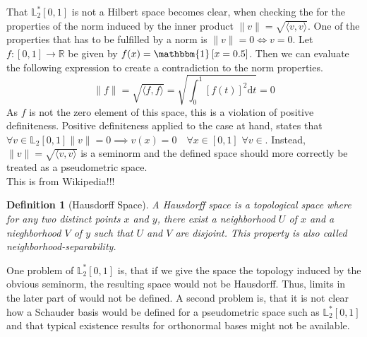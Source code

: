 \documentclass[12pt, a4paper]{article}
\theoremstyle{MAstyle} \newtheorem{assumption}{Assumption}[section]
\theoremstyle{MAstyle} \newtheorem{definition}{Definition}[section]
\theoremstyle{MAstyle} \newtheorem{theorem}{Theorem}[section]
\begin{document}
		That $\mathbb{L}^{*}_2[0,1]$ is not a Hilbert space becomes clear, when checking the for the properties of the norm induced by the inner product $\| v \| = \sqrt{\langle v, v\rangle}$.
		One of the properties that has to be fulfilled by a norm is $\| v \| = 0 \Longleftrightarrow v = 0$.			
		Let $f:[0,1] \rightarrow \mathbb{R}$ be given by $f(x) = \mathbbm{1}\left[x = 0.5\right]$. Then we can evaluate the following expression to create a contradiction to the norm properties.
		\begin{equation}
			\| f \| = \sqrt{\langle f, f\rangle} = \sqrt{\int_{0}^{1} \left[f(t)\right]^2\mathrm{d}t } = 0
		\end{equation}
		As $f$ is not the zero element of this space, this is a violation of positive definiteness. Positive definiteness applied to the case at hand, states that $\forall v \in \mathbb{L}_2[0,1] \| v \| = 0 \implies v(x) = 0 \quad \forall x \in [0,1]$  $\forall v \in $. Instead, $\| v \| = \sqrt{\langle v, v\rangle}$ is a seminorm and the defined space should more correctly be treated as a pseudometric space.\\
		
		{\color{red} This is from Wikipedia!!!}
		\begin{definition}[Hausdorff Space]
			A Hausdorff space is a topological space where for any two distinct points $x$ and $y$, there exist a neighborhood $U$ of $x$ and a nieghborhood $V$ of $y$ such that $U$ and $V$ are disjoint. This property is also called neighborhood-separability.
		\end{definition}
		
		One problem of $\mathbb{L}^{*}_2[0,1]$ is, that if we give the space the topology induced by the obvious seminorm, the resulting space would not be Hausdorff. Thus, limits in the later part of \cite{bugni_permutation_2021} would not be defined.
		A second problem is, that it is not clear how a Schauder basis would be defined for a pseudometric space such as $\mathbb{L}^{*}_2[0,1]$ and that typical existence results for orthonormal bases might not be available.\\				
		
\end{document}
